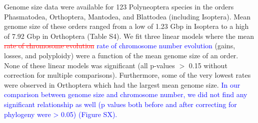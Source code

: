 \documentclass[]{rsos}%
\begin{document}
Genome size data were available for 123 Polyneoptera species in the orders Phasmatodea, Orthoptera, Mantodea, and Blattodea (including Isoptera).
Mean genome size of these orders ranged from a low of 1.23 Gbp in Isoptera to a high of 7.92 Gbp in Orthoptera (Table S4).
We fit three linear models where the mean \textcolor{red}{\st{rate of chromosome evolution}} \textcolor{blue}{rate of chromosome number evolution} (gains, losses, and polyploidy) were a function of the mean genome size of an order.
None of these linear models was significant (all p-values $>$ 0.15 without correction for multiple comparisons).
Furthermore, some of the very lowest rates were observed in Orthoptera which had the largest mean genome size.
\textcolor{blue}{In our comparison between genome size and chromosome number, we did not find any significant relationship as well (p values both before and after correcting for phylogeny were > 0.05) (Figure SX).}
\end{document}
